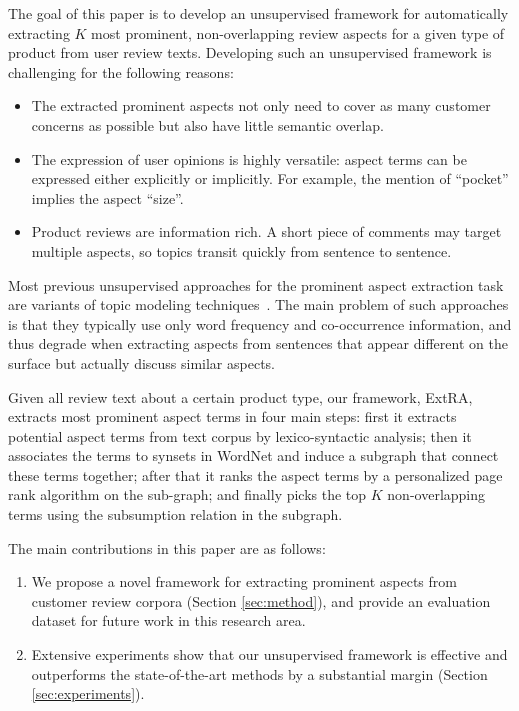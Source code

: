 \documentclass[11pt,a4paper]{article}
\newcommand{\secref}[1]{Section \ref{#1}}
\begin{document}
The goal of this paper is to develop an unsupervised framework 
for automatically extracting $K$ most prominent, non-overlapping 
review aspects for a given type of product from user review texts.  
Developing such an unsupervised framework is challenging for 
the following reasons: 
\begin{itemize}
	\item 
	The extracted prominent aspects not only need to cover as many customer concerns as possible but also have little semantic overlap. 
	\item The expression of user opinions is highly versatile: 
	aspect terms can be expressed either explicitly or implicitly. For example,
	the mention of ``pocket'' implies the aspect ``size''.
	\item Product reviews are information rich. A short piece of comments 
	may target multiple aspects, so topics transit quickly from sentence 
	to sentence. 
\end{itemize}

Most previous unsupervised approaches for the prominent 
aspect extraction task are variants of topic modeling 
techniques~\cite{lakkaraju2011exploiting,lin2009joint,wang2011latent}.
The main problem of such approaches 
is that they typically use only word frequency and co-occurrence information, 
and thus degrade when extracting aspects from sentences that appear
different on the surface but actually discuss similar aspects. 

Given all review text about a certain product type, our framework, ExtRA,
extracts most prominent aspect terms in four main steps: 
first it extracts potential aspect terms from text corpus by lexico-syntactic 
analysis; then it associates
the terms to synsets in WordNet and induce a subgraph that connect these
terms together; after that it ranks the aspect terms by a personalized page rank
algorithm on the sub-graph; and finally picks the top $K$ non-overlapping 
terms using the subsumption relation in the subgraph. 


The main contributions in this paper are as follows:
\begin{enumerate}
	\item We propose a novel framework for extracting prominent aspects 
	from customer review corpora (\secref{sec:method}), and provide an evaluation dataset for future work in this research area.
	\item Extensive experiments show that our unsupervised framework is effective and 
	outperforms the state-of-the-art methods by a substantial margin (\secref{sec:experiments}).
\end{enumerate}
\end{document}
